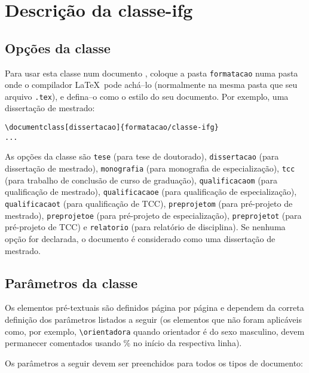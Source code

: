 \chapter{Descrição da \textsf{classe-ifg}}
\label{cap:descr}

\section{Opções da classe}
\label{sec:opcoes}
Para usar esta classe num documento \LaTeXe, coloque a pasta \verb|formatacao| numa pasta onde o compilador \LaTeX\ pode achá--lo (normalmente na mesma pasta que seu arquivo \verb|.tex|), e defina--o como o estilo do seu documento. Por exemplo, uma dissertação de mestrado:
\begin{verbatim}
\documentclass[dissertacao]{formatacao/classe-ifg}
...

\end{verbatim}

As opções da classe são \verb|tese| (para tese de doutorado), \verb|dissertacao| (para dissertação de mestrado), \verb|monografia| (para monografia de especialização), \verb|tcc| (para trabalho de conclusão de curso de graduação), \verb|qualificacaom| (para qualificação de mestrado), \verb|qualificacaoe| (para qualificação de especialização), \verb|qualificacaot| (para qualificação de TCC), \verb|preprojetom| (para pré-projeto de mestrado), \verb|preprojetoe| (para pré-projeto de especialização), \verb|preprojetot| (para pré-projeto de TCC) e \verb|relatorio| (para relatório de disciplina). Se nenhuma opção for declarada, o documento é considerado como uma dissertação de mestrado.


\section{Parâmetros da classe}
\label{sec:param}
Os elementos pré-textuais são definidos página por página e dependem da correta definição dos parâmetros listados a seguir (os elementos que não foram aplicáveis como, por exemplo, \verb|\orientadora| quando orientador é do sexo masculino, devem permanecer comentados usando \% no início da respectiva linha).


Os parâmetros a seguir devem ser preenchidos para todos os tipos de documento:

